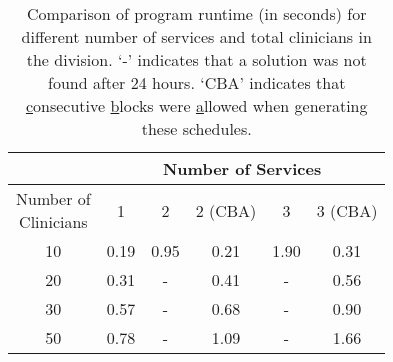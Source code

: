 \begin{table}[htbp]
	\centering
	\begin{tabular}{|c|c||c|c||c|c|}
		\hline
		                                      & \multicolumn{5}{c|}{Number of Services} \\ \hline
		\makecell[l]{Number of \\ Clinicians} &  1   &  2   & 2 (CBA) &  3   &  3 (CBA)  \\ \hline
		                 10                   & 0.19 & 0.95 &  0.21   & 1.90 &   0.31    \\ \hline
		                 20                   & 0.31 &  -   &  0.41   &  -   &   0.56    \\ \hline
		                 30                   & 0.57 &  -   &  0.68   &  -   &   0.90    \\ \hline
		                 50                   & 0.78 &  -   &  1.09   &  -   &   1.66    \\ \hline
	\end{tabular}
	\caption{Comparison of program runtime (in seconds) for different number of services and total clinicians in the division. `-' indicates that a solution was not found after 24 hours. `CBA' indicates that \underline{c}onsecutive \underline{b}locks were \underline{a}llowed when generating these schedules.}
	\label{tbl:runtime-services-clinicians-comparison}%
\end{table}
